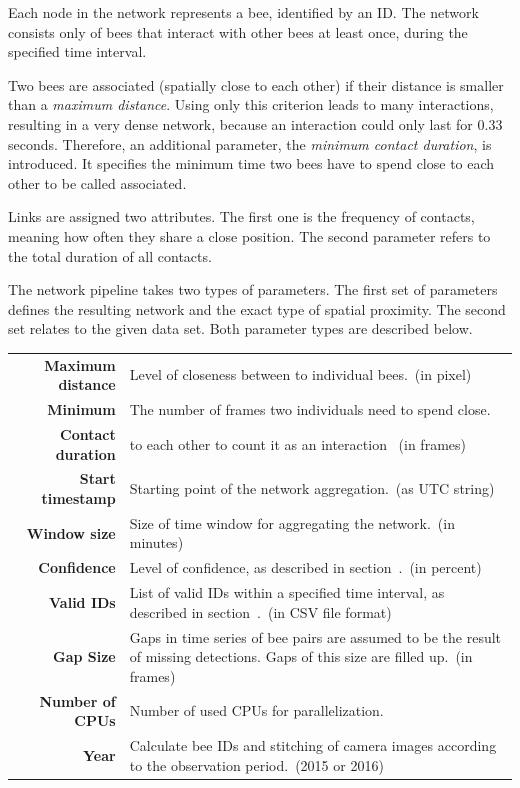 Each node in the network represents a bee, identified by an ID.
The network consists only of bees that interact with other bees at least once, during the specified time interval.

Two bees are associated (spatially close to each other) if their distance is smaller than a \emph{maximum distance}.
Using only this criterion leads to many interactions, resulting in a very dense network, because an interaction could only last for 0.33 seconds.
Therefore, an additional parameter, the \emph{minimum contact duration}, is introduced.
It specifies the minimum time two bees have to spend close to each other to be called associated.

Links are assigned two attributes.
The first one is the frequency of contacts, meaning how often they share a close position. The second parameter refers to the total duration of all contacts.

The network pipeline takes two types of parameters. The first set of parameters defines the resulting network and the exact type of spatial proximity. The second set relates to the given data set. Both parameter types are described below.

\begin{table}[htbp]
\small
\centering
\begin{tabularx}{\textwidth}{@{} r Y @{}}
\textbf{Maximum distance} & Level of closeness between to individual bees.~(in pixel) \vspace{2mm} \\
\textbf{Minimum} & The number of frames two individuals need to spend close.\\
\textbf{Contact duration} &  to each other to count it as an interaction ~(in frames) \vspace{2mm} \\
\textbf{Start timestamp} & Starting point of the network aggregation.~(as UTC string) \vspace{2mm} \\
\textbf{Window size} & Size of time window for aggregating the network.~(in minutes) \vspace{6mm}\\
\textbf{Confidence} & Level of confidence, as described in section~.~(in percent) \vspace{2mm}\\
\textbf{Valid IDs} & List of valid IDs within a specified time interval, as described in section~.~(in CSV file format) \vspace{2mm}\\
\textbf{Gap Size} & Gaps in time series of bee pairs are assumed to be the result of missing detections. Gaps of this size are filled up.~(in frames)\vspace{2mm}\\
\textbf{Number of CPUs} & Number of used CPUs for parallelization. \vspace{2mm}\\
\textbf{Year} & Calculate bee IDs and stitching of camera images according to the observation period.~(2015 or 2016)\\
\end{tabularx}
\end{table}

